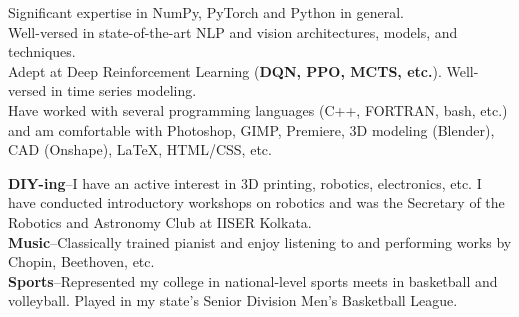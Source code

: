 \documentclass[10pt,a4paper]{article}
\begin{document}

\spacedhrule{1em}{-0.4em}


  Significant expertise in NumPy, PyTorch and Python in general.\\
  Well-versed in state-of-the-art NLP and vision architectures, models, and techniques.\\
  Adept at Deep Reinforcement Learning (\textbf{DQN, PPO, MCTS, etc.}). Well-versed in time series modeling. \\
  Have worked with several programming languages (C++, FORTRAN, bash, etc.)
 and am comfortable with Photoshop, GIMP, Premiere, 3D modeling (Blender), CAD (Onshape), \LaTeX, HTML/CSS, etc.

\spacedhrule{1em}{-0.4em}


	  \textbf{DIY-ing}--I have an active interest in 3D printing,
     robotics, electronics, etc. I have conducted introductory workshops on
     robotics and was the Secretary of the Robotics and Astronomy Club at IISER
     Kolkata.\\
	  \textbf{Music}--Classically trained pianist and enjoy listening
     to and performing works by Chopin, Beethoven, etc.\\
	  \textbf{Sports}--Represented my college in national-level sports
     meets in basketball and volleyball. Played in my state's Senior Division
     Men's Basketball League.\\

\spacedhrule{1em}{-0.4em}
\end{document}
